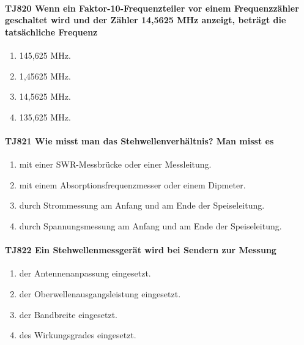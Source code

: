 \documentclass[8pt]{article}
\begin{document}
\paragraph*{TJ820 Wenn ein Faktor-10-Frequenzteiler vor einem Frequenzzähler geschaltet wird und der Zähler 14,5625 MHz anzeigt, beträgt die tatsächliche Frequenz}
\begin{enumerate}[nolistsep,label=\Alph*]
\item 145,625 MHz.
\item 1,45625 MHz.
\item 14,5625 MHz.
\item 135,625 MHz.
\end{enumerate}

\paragraph*{TJ821 Wie misst man das Stehwellenverhältnis? Man misst es}
\begin{enumerate}[nolistsep,label=\Alph*]
\item mit einer SWR-Messbrücke oder einer Messleitung.
\item mit einem Absorptionsfrequenzmesser oder einem Dipmeter.
\item durch Strommessung am Anfang und am Ende der Speiseleitung.
\item durch Spannungsmessung am Anfang und am Ende der Speiseleitung.
\end{enumerate}

\paragraph*{TJ822 Ein Stehwellenmessgerät wird bei Sendern zur Messung} 
\begin{enumerate}[nolistsep,label=\Alph*]
\item der Antennenanpassung eingesetzt.
\item der Oberwellenausgangsleistung eingesetzt.
\item der Bandbreite eingesetzt.
\item des Wirkungsgrades eingesetzt.
\end{enumerate}
\end{document}
